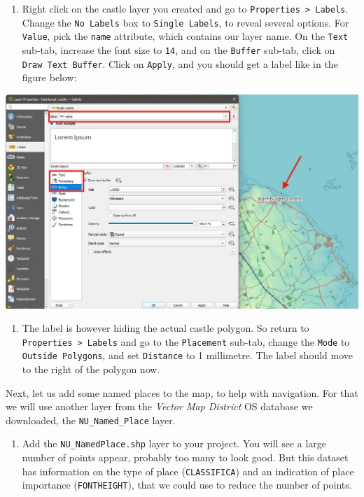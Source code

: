 \documentclass[
  letterpaper,
  DIV=11,
  numbers=noendperiod]{scrreprt}
\providecommand{\tightlist}{%
  \setlength{\itemsep}{0pt}\setlength{\parskip}{0pt}}\usepackage{longtable,booktabs,array}
\begin{document}
\begin{enumerate}
\def\labelenumi{(\arabic{enumi})}
\setcounter{enumi}{228}
\tightlist
\item
  Right click on the castle layer you created and go to
  \texttt{Properties\ \textgreater{}\ Labels}. Change the
  \texttt{No\ Labels} box to \texttt{Single\ Labels}, to reveal several
  options. For \texttt{Value}, pick the \texttt{name} attribute, which
  contains our layer name. On the \texttt{Text} sub-tab, increase the
  font size to \texttt{14}, and on the \texttt{Buffer} sub-tab, click on
  \texttt{Draw\ Text\ Buffer}. Click on \texttt{Apply}, and you should
  get a label like in the figure below:
\end{enumerate}

\includegraphics{images/lab_8/lab8_fig5_label_window.jpg}

\begin{enumerate}
\def\labelenumi{(\arabic{enumi})}
\setcounter{enumi}{229}
\tightlist
\item
  The label is however hiding the actual castle polygon. So return to
  \texttt{Properties\ \textgreater{}\ Labels} and go to the
  \texttt{Placement} sub-tab, change the \texttt{Mode} to
  \texttt{Outside\ Polygons}, and set \texttt{Distance} to 1 millimetre.
  The label should move to the right of the polygon now.
\end{enumerate}

Next, let us add some named places to the map, to help with navigation.
For that we will use another layer from the \emph{Vector Map District}
OS database we downloaded, the \texttt{NU\_Named\_Place} layer.

\begin{enumerate}
\def\labelenumi{(\arabic{enumi})}
\setcounter{enumi}{230}
\tightlist
\item
  Add the \texttt{NU\_NamedPlace.shp} layer to your project. You will
  see a large number of points appear, probably too many to look good.
  But this dataset has information on the type of place
  (\texttt{CLASSIFICA}) and an indication of place importance
  (\texttt{FONTHEIGHT}), that we could use to reduce the number of
  points.
\end{enumerate}
\end{document}
